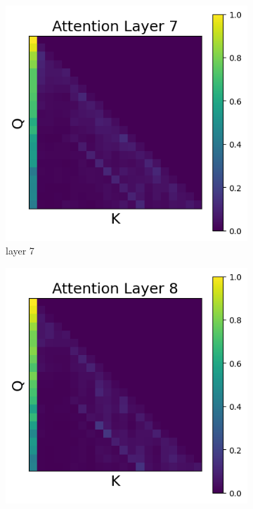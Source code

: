 \documentclass[11pt]{article}
\begin{document}
\begin{figure}[t]
    \begin{subfigure}[t]{0.24\textwidth}
    \centering
    \includegraphics[width=1.4\columnwidth]{figures/no_intervention/layer_7.png}
    \caption{layer 7}
  \end{subfigure}\hfill
      \begin{subfigure}[t]{0.24\textwidth}
    \centering
    \includegraphics[width=1.4\columnwidth]{figures/no_intervention/layer_8.png}

\end{subfigure}
\end{figure}
\end{document}
